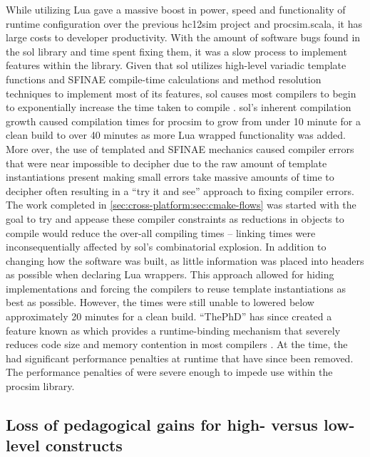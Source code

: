 While utilizing Lua gave a massive boost in power, speed and functionality of runtime configuration over the previous hc12sim project and procsim.scala, it has large costs to developer productivity. With the amount of software bugs found in the sol library and time spent fixing them, it was a slow process to implement features within the library. Given that sol utilizes high-level variadic template functions and SFINAE compile-time calculations and method resolution techniques \cite{cppreference:SFINAE} to implement most of its features, sol causes most compilers to begin to exponentially increase the time taken to compile \cite{GitHub:ThePhD:sol2:issue:126, GitHub:ThePhD:sol2:issue:295, GitHub:ThePhD:sol2:compilation}. sol's inherent compilation growth caused compilation times for procsim to grow from under 10 minute for a clean build to over 40 minutes as more Lua wrapped functionality was added. More over, the use of templated and SFINAE mechanics caused compiler errors that were near impossible to decipher due to the raw amount of template instantiations present making small errors take massive amounts of time to decipher often resulting in a ``try it and see'' approach to fixing compiler errors. The work completed in \cref{sec:cross-platform:sec:cmake-flows} was started with the goal to try and appease these compiler constraints as reductions in objects to compile would reduce the over-all compiling times -- linking times were inconsequentially affected by sol's combinatorial explosion. In addition to changing how the software was built, as little information was placed into headers as possible when declaring Lua wrappers. This approach allowed for hiding implementations and forcing the compilers to reuse template instantiations as best as possible. However, the times were still unable to lowered below approximately 20 minutes for a clean build. ``ThePhD'' has since created a feature known as  which provides a runtime-binding mechanism that severely reduces code size and memory contention in most compilers \cite{GitHub:ThePhD:sol2:simple-usertype}. At the time, the  had significant performance penalties at runtime that have since been removed. The performance penalties of  were severe enough to impede use within the procsim library.

\subsection{Loss of pedagogical gains for high- versus low-level constructs}

